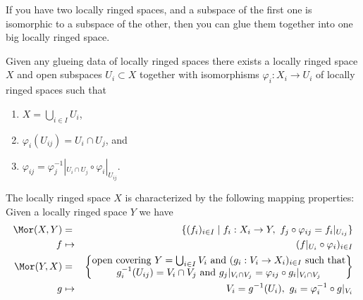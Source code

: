 \begin{lemma}
\label{lemma-glue}
\begin{reference}
\cite[Chapter II, \S 1, no. 34, Proposition 8, p. 227]{FAC}
\end{reference}
\begin{slogan}
If you have two locally ringed spaces, and a subspace of the first one
is isomorphic to a subspace of the other, then you can glue them together
into one big locally ringed space.
\end{slogan}
Given any glueing data of locally ringed spaces there
exists a locally ringed space $X$ and open subspaces
$U_i \subset X$ together with isomorphisms
$\varphi_i : X_i \to U_i$ of locally ringed spaces such that
\begin{enumerate}
\item $X=\bigcup_{i\in I} U_i$,
\item $\varphi_i(U_{ij}) = U_i \cap U_j$, and
\item $\varphi_{ij} =
\varphi_j^{-1}|_{U_i \cap U_j} \circ \varphi_i|_{U_{ij}}$.
\end{enumerate}
The locally ringed space $X$ is characterized by the following
mapping properties: Given a locally ringed space $Y$ we have
\begin{eqnarray*}
\Mor(X, Y) & = & \{ (f_i)_{i\in I} \mid
f_i : X_i \to Y, \ f_j \circ \varphi_{ij} = f_i|_{U_{ij}}\} \\
f & \mapsto & (f|_{U_i} \circ \varphi_i)_{i \in I} \\
\Mor(Y, X) & = &
\left\{
\begin{matrix}
\text{open covering }Y = \bigcup\nolimits_{i \in I} V_i\text{ and }
(g_i : V_i \to X_i)_{i \in I}
\text{ such that}\\
g_i^{-1}(U_{ij}) = V_i \cap V_j
\text{ and }
g_j|_{V_i \cap V_j} = \varphi_{ij} \circ g_i|_{V_i \cap V_j}
\end{matrix}
\right\} \\
g & \mapsto &
V_i = g^{-1}(U_i), \ g_i = \varphi_i^{-1} \circ g|_{V_i}
\end{eqnarray*}
\end{lemma}

